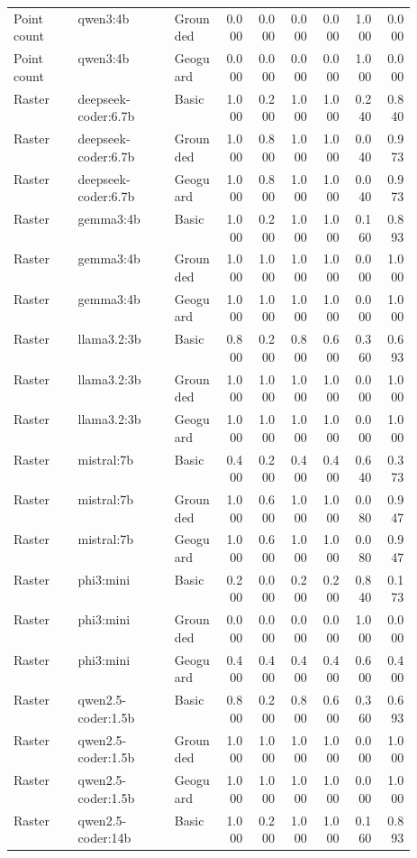 \begin{longtable}{p{0.16\linewidth}p{0.24\linewidth}p{0.12\linewidth}rrrrrr}
Point count & qwen3:4b & Grounded & 0.000 & 0.000 & 0.000 & 0.000 & 1.000 & 0.000 \\
Point count & qwen3:4b & Geoguard & 0.000 & 0.000 & 0.000 & 0.000 & 1.000 & 0.000 \\
Raster & deepseek-coder:6.7b & Basic & 1.000 & 0.200 & 1.000 & 1.000 & 0.240 & 0.840 \\
Raster & deepseek-coder:6.7b & Grounded & 1.000 & 0.800 & 1.000 & 1.000 & 0.040 & 0.973 \\
Raster & deepseek-coder:6.7b & Geoguard & 1.000 & 0.800 & 1.000 & 1.000 & 0.040 & 0.973 \\
Raster & gemma3:4b & Basic & 1.000 & 0.200 & 1.000 & 1.000 & 0.160 & 0.893 \\
Raster & gemma3:4b & Grounded & 1.000 & 1.000 & 1.000 & 1.000 & 0.000 & 1.000 \\
Raster & gemma3:4b & Geoguard & 1.000 & 1.000 & 1.000 & 1.000 & 0.000 & 1.000 \\
Raster & llama3.2:3b & Basic & 0.800 & 0.200 & 0.800 & 0.600 & 0.360 & 0.693 \\
Raster & llama3.2:3b & Grounded & 1.000 & 1.000 & 1.000 & 1.000 & 0.000 & 1.000 \\
Raster & llama3.2:3b & Geoguard & 1.000 & 1.000 & 1.000 & 1.000 & 0.000 & 1.000 \\
Raster & mistral:7b & Basic & 0.400 & 0.200 & 0.400 & 0.400 & 0.640 & 0.373 \\
Raster & mistral:7b & Grounded & 1.000 & 0.600 & 1.000 & 1.000 & 0.080 & 0.947 \\
Raster & mistral:7b & Geoguard & 1.000 & 0.600 & 1.000 & 1.000 & 0.080 & 0.947 \\
Raster & phi3:mini & Basic & 0.200 & 0.000 & 0.200 & 0.200 & 0.840 & 0.173 \\
Raster & phi3:mini & Grounded & 0.000 & 0.000 & 0.000 & 0.000 & 1.000 & 0.000 \\
Raster & phi3:mini & Geoguard & 0.400 & 0.400 & 0.400 & 0.400 & 0.600 & 0.400 \\
Raster & qwen2.5-coder:1.5b & Basic & 0.800 & 0.200 & 0.800 & 0.600 & 0.360 & 0.693 \\
Raster & qwen2.5-coder:1.5b & Grounded & 1.000 & 1.000 & 1.000 & 1.000 & 0.000 & 1.000 \\
Raster & qwen2.5-coder:1.5b & Geoguard & 1.000 & 1.000 & 1.000 & 1.000 & 0.000 & 1.000 \\
Raster & qwen2.5-coder:14b & Basic & 1.000 & 0.200 & 1.000 & 1.000 & 0.160 & 0.893 \\

\end{longtable}
